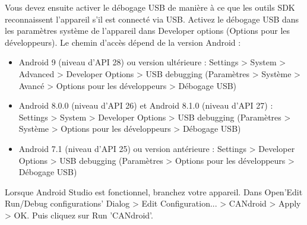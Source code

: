Vous devez ensuite activer le débogage USB de manière à ce que les outils SDK reconnaissent l'appareil s'il est connecté via USB. 
Activez le débogage USB dans les paramètres système de l'appareil dans Developer options (Options pour les développeurs). Le chemin d'accès dépend de la version Android : 

\begin{itemize}
    \item Android 9 (niveau d'API 28) ou version ultérieure : Settings > System > Advanced > Developer Options > USB debugging (Paramètres > Système > Avancé > Options pour les développeurs > Débogage USB) 
    \item Android 8.0.0 (niveau d'API 26) et Android 8.1.0 (niveau d'API 27) : Settings > System > Developer Options > USB debugging (Paramètres > Système > Options pour les développeurs > Débogage USB) 
    \item Android 7.1 (niveau d'API 25) ou version antérieure : Settings > Developer Options > USB debugging (Paramètres > Options pour les développeurs > Débogage USB)
\end{itemize}



Lorsque Android Studio est fonctionnel, branchez votre appareil. Dans Open'Edit Run/Debug configurations' Dialog > Edit Configuration... > CANdroid > Apply > OK. Puis cliquez sur Run 'CANdroid'. 